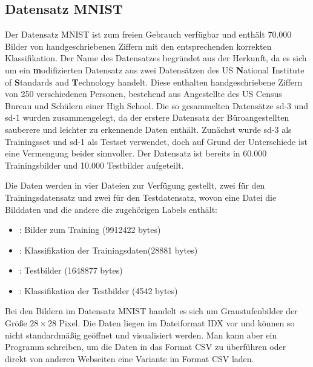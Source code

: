 %
%


\subsection{Datensatz MNIST}

Der Datensatz MNIST ist zum freien Gebrauch verfügbar und enthält 70.000 Bilder von handgeschriebenen Ziffern mit den entsprechenden korrekten Klassifikation. \cite{Deng:2009,Deng:2012} Der Name des Datensatzes begründet aus der Herkunft, da es sich um ein \textbf{m}odifizierten Datensatz aus zwei Datensätzen des US \textbf{N}ational \textbf{I}nstitute of \textbf{S}tandards and \textbf{T}echnology handelt. Diese enthalten handgeschriebene Ziffern von 250 verschiedenen Personen, bestehend aus Angestellte des US Census Bureau und Schülern einer High School. Die so gesammelten Datensätze \ac{sd-3} und \ac{sd-1} wurden zusammengelegt, da der erstere Datensatz der Büroangestellten  sauberere und leichter zu erkennende Daten enthält. Zunächst wurde \ac{sd-3} als Trainingsset und \ac{sd-1} als Testset verwendet, doch auf Grund der Unterschiede ist eine Vermengung beider sinnvoller. Der Datensatz ist bereits in 60.000 Trainingsbilder und 10.000 Testbilder aufgeteilt. \cite{LeCun:2013,Nielsen:2015}

Die Daten werden in vier Dateien zur Verfügung gestellt, zwei für den Trainingsdatensatz und zwei für den Testdatensatz, wovon eine Datei die Bilddaten 
und die andere die zugehörigen Labels enthält:


\begin{itemize}
    \item {}:  Bilder zum Training (9912422 bytes)
    \item {}:  Klassifikation der Trainingsdaten(28881 bytes)
    \item {}:  Testbilder (1648877 bytes)
    \item {}:  Klassifikation der Testbilder (4542 bytes)
\end{itemize}


Bei den Bildern im Datensatz MNIST handelt es sich um Graustufenbilder der Größe $28 \times 28$ Pixel.\cite{LeCun:2013} Die Daten liegen im Dateiformat IDX vor und können so nicht standardmäßig geöffnet und visualisiert werden. Man kann aber ein Programm schreiben, um die Daten in das Format CSV zu überführen oder direkt von anderen Webseiten eine Variante im Format CSV laden. \cite{Redmon.04.12.2020}



